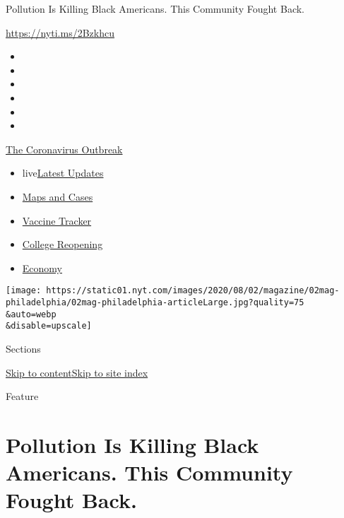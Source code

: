 Pollution Is Killing Black Americans. This Community Fought Back.

\url{https://nyti.ms/2Bzkhcu}

\begin{itemize}
\item
\item
\item
\item
\item
\item
\end{itemize}

\href{https://www.nytimes.com/news-event/coronavirus?action=click\&pgtype=Article\&state=default\&region=TOP_BANNER\&context=storylines_menu}{The
Coronavirus Outbreak}

\begin{itemize}
\tightlist
\item
  live\href{https://www.nytimes.com/2020/08/03/world/coronavirus-covid-19.html?action=click\&pgtype=Article\&state=default\&region=TOP_BANNER\&context=storylines_menu}{Latest
  Updates}
\item
  \href{https://www.nytimes.com/interactive/2020/us/coronavirus-us-cases.html?action=click\&pgtype=Article\&state=default\&region=TOP_BANNER\&context=storylines_menu}{Maps
  and Cases}
\item
  \href{https://www.nytimes.com/interactive/2020/science/coronavirus-vaccine-tracker.html?action=click\&pgtype=Article\&state=default\&region=TOP_BANNER\&context=storylines_menu}{Vaccine
  Tracker}
\item
  \href{https://www.nytimes.com/2020/08/02/us/covid-college-reopening.html?action=click\&pgtype=Article\&state=default\&region=TOP_BANNER\&context=storylines_menu}{College
  Reopening}
\item
  \href{https://www.nytimes.com/live/2020/08/03/business/stock-market-today-coronavirus?action=click\&pgtype=Article\&state=default\&region=TOP_BANNER\&context=storylines_menu}{Economy}
\end{itemize}

\texttt{[image: https://static01.nyt.com/images/2020/08/02/magazine/02mag-philadelphia/02mag-philadelphia-articleLarge.jpg?quality=75\\\&auto=webp\\\&disable=upscale]}

Sections

\protect\hyperlink{site-content}{Skip to
content}\protect\hyperlink{site-index}{Skip to site index}

Feature

\hypertarget{pollution-is-killing-black-americans-this-community-fought-back}{%
\section{Pollution Is Killing Black Americans. This Community Fought
Back.}\label{pollution-is-killing-black-americans-this-community-fought-back}}

